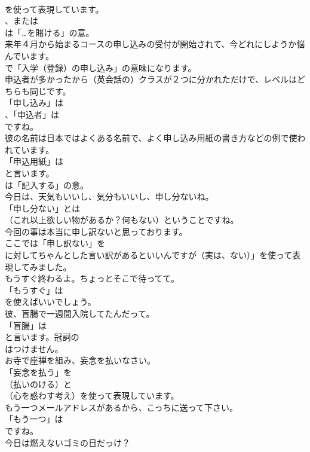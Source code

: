 \documentclass[8pt]{extreport}
\begin{document}
\begin{CJK}{UTF8}{min}
\\	を使って表現しています。
\\	、または 
\\	は「…を賭ける」の意。	
\\	来年４月から始まるコースの申し込みの受付が開始されて、今どれにしようか悩んでいます。 
\\	で「入学（登録）の申し込み」の意味になります。	
\\	申込者が多かったから（英会話の）クラスが２つに分かれただけで、レベルはどちらも同じです。 
\\	「申し込み」は
\\	、「申込者」は
\\	ですね。	
\\	彼の名前は日本ではよくある名前で、よく申し込み用紙の書き方などの例で使われています。 
\\	「申込用紙」は 
\\	と言います。
\\	は「記入する」の意。	
\\	今日は、天気もいいし、気分もいいし、申し分ないね。 
\\	「申し分ない」とは
\\	（これ以上欲しい物があるか？何もない）ということですね。	
\\	今回の事は本当に申し訳ないと思っております。 
\\	ここでは「申し訳ない」を
\\	に対してちゃんとした言い訳があるといいんですが（実は、ない）」を使って表現してみました。	
\\	もうすぐ終わるよ。ちょっとそこで待ってて。 
\\	「もうすぐ」は
\\	を使えばいいでしょう。	
\\	彼、盲腸で一週間入院してたんだって。 
\\	「盲腸」は
\\	と言います。冠詞の
\\	はつけません。	
\\	お寺で座禅を組み、妄念を払いなさい。 
\\	「妄念を払う」を 
\\	（払いのける）と 
\\	（心を惑わす考え）を使って表現しています。	
\\	もう一つメールアドレスがあるから、こっちに送って下さい。 
\\	「もう一つ」は
\\	ですね。	
\\	今日は燃えないゴミの日だっけ？ 

\end{CJK}
\end{document}
